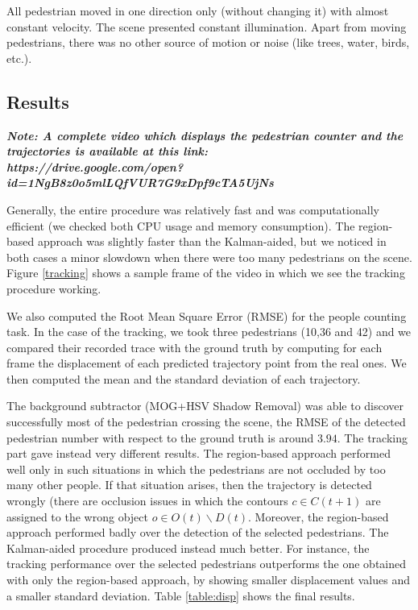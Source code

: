 \documentclass[runningheads]{llncs}
\begin{document}
All pedestrian moved in one direction only (without changing it) with almost constant velocity. The scene presented constant illumination. Apart from moving pedestrians, there was no other source of motion or noise (like trees, water, birds, etc.).

\subsection{Results}

\textit{\textbf{Note: A complete video which displays the pedestrian counter and the trajectories is available at this link:\\ https://drive.google.com/open?id=1NgB8z0o5mlLQfVUR7G9xDpf9cTA5UjNs}}
\medskip

Generally, the entire procedure was relatively fast and was computationally efficient (we checked both CPU usage and memory consumption). The region-based approach was slightly faster than the Kalman-aided, but we noticed in both cases a minor slowdown when there were too many pedestrians on the scene. Figure \ref{tracking} shows a sample frame of the video in which we see the tracking procedure working.

We also computed the Root Mean Square Error (RMSE) for the people counting task. In the case of the tracking, we took three pedestrians (10,36 and 42) and we compared their recorded trace with the ground truth by computing for each frame the displacement of each predicted trajectory point from the real ones. We then computed the mean and the standard deviation of each trajectory.

The background subtractor (MOG+HSV Shadow Removal) was able to discover successfully most of the pedestrian crossing the scene, the RMSE of the detected pedestrian number with respect to the ground truth is around $3.94$. 
The tracking part gave instead very different results. The region-based approach performed well only in such situations in which the pedestrians are not occluded by too many other people. If that situation arises, then the trajectory is detected wrongly (there are occlusion issues in which the contours $c \in C(t+1)$ are assigned to the wrong object $o \in O(t)\backslash D(t)$. Moreover, the region-based approach performed badly over the detection of the selected pedestrians. 
The Kalman-aided procedure produced instead much better. For instance, the tracking performance over the selected pedestrians outperforms the one obtained with only the region-based approach, by showing smaller displacement values and a smaller standard deviation. Table \ref{table:disp} shows the final results.
\end{document}
